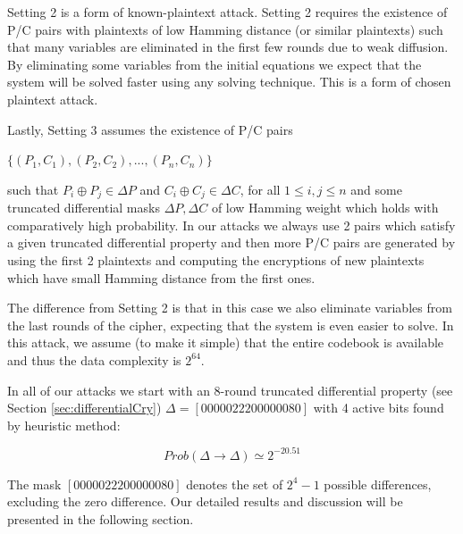 Setting 2 is a form of known-plaintext attack. Setting 2 requires the existence of P/C pairs with plaintexts
of low Hamming distance (or similar plaintexts)
such that many variables are eliminated in the first few rounds due to weak
diffusion. By eliminating some variables from the initial equations we expect that
the system will be solved faster using any solving technique. This is a form of
chosen plaintext attack.

Lastly, Setting 3 assumes the existence of P/C pairs

\begin{center}
	$\{(P_1,C_1),(P_2,C_2),...,(P_n,C_n)\}$
\end{center}

such that
$P_i\oplus P_j \in \Delta P$ and $C_i\oplus C_j \in \Delta C$, for
all $1\leq i,j \leq n$ and some truncated differential masks $\Delta P,\Delta C$
of low Hamming weight which holds with comparatively high probability.
In our attacks we always use 2 pairs which satisfy a given truncated
differential property and then more P/C pairs are generated by using the
first 2 plaintexts and computing the encryptions of new plaintexts which have small Hamming distance from the
first ones. 

The difference
from Setting 2 is that in this case we also eliminate variables
from the last rounds of the cipher, expecting that the system is even easier to solve. In this
attack, we assume (to make it simple) that the entire codebook is available and thus the
data complexity is $2^{64}$.

In all of our attacks we start with an 8-round truncated differential property (see Section \ref{sec:differentialCry}) $\Delta=[00000222 00000080]$
with 4 active bits found by heuristic method:

\begin{equation}
Prob(\Delta\rightarrow \Delta)\simeq2^{-20.51}
\end{equation}

The mask $[00000222 00000080]$ denotes the set of $2^4-1$ possible differences,
excluding the zero difference.
Our detailed results and discussion will be presented in the following section.

